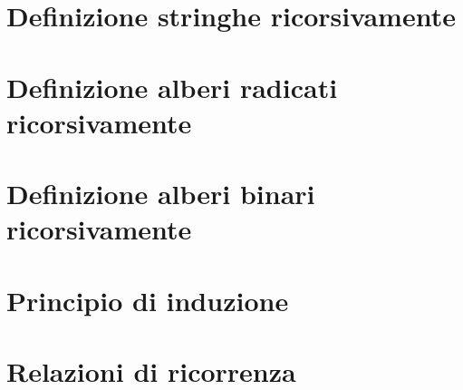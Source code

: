 \documentclass[a4paper, 12pt, oneside]{book}
\theoremstyle{example}
\begin{document}
\chapter{Definizione stringhe ricorsivamente}
\label{cha:def_ric_str}


\chapter{Definizione alberi radicati ricorsivamente}
\label{cha:def_ric_albero_radicato}


\chapter{Definizione alberi binari ricorsivamente}
\label{cha:def_ric_albero_binario}


\chapter{Principio di induzione}
\label{cha:principio_induzione}


\chapter{Relazioni di ricorrenza}
\label{cha:rel_ric}



\backmatter

\listoffigures
\clearpage

\listoftables
\clearpage
\end{document}
